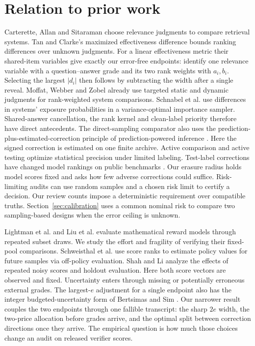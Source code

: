 \documentclass[11pt]{article}
\begin{document}
\section{Relation to prior work}
Carterette, Allan and Sitaraman \cite{carterette} choose relevance judgments to compare retrieval systems. Tan and Clarke's maximized effectiveness difference \cite{tan} bounds ranking differences over unknown judgments. For a linear effectiveness metric their shared-item variables give exactly our error-free endpoints: identify one relevance variable with a question--answer grade and its two rank weights with $a_i,b_i$. Selecting the largest $|d_i|$ then follows by subtracting the width after a single reveal. Moffat, Webber and Zobel \cite{moffat} already use targeted static and dynamic judgments for rank-weighted system comparisons. Schnabel et al. \cite{schnabel} use differences in systems' exposure probabilities in a variance-optimal importance sampler. Shared-answer cancellation, the rank kernel and clean-label priority therefore have direct antecedents. The direct-sampling comparator also uses the prediction-plus-estimated-correction principle of prediction-powered inference \cite{ppi}. Here the signed correction is estimated on one finite archive. Active comparison \cite{sawade} and active testing \cite{kossen} optimize statistical precision under limited labeling. Test-label corrections have changed model rankings on public benchmarks \cite{northcutt}. Our erasure radius holds model scores fixed and asks how few adverse corrections could suffice. Risk-limiting audits \cite{stark} can use random samples and a chosen risk limit to certify a decision. Our review counts impose a deterministic requirement over compatible truths. Section~\ref{sec:calibration} uses a common nominal risk to compare two sampling-based designs when the error ceiling is unknown.

Lightman et al. \cite{lightman} and Liu et al. \cite{ace} evaluate mathematical reward models through repeated subset draws. We study the effort and fragility of verifying their fixed-pool comparisons. Schweisthal et al. \cite{bon} use score ranks to estimate policy values for future samples via off-policy evaluation. Shah and Li \cite{hold} analyze the effects of repeated noisy scores and holdout evaluation. Here both score vectors are observed and fixed. Uncertainty enters through missing or potentially erroneous external grades. The largest-$e$ adjustment for a single endpoint also has the integer budgeted-uncertainty form of Bertsimas and Sim \cite{bertsimas}. Our narrower result couples the two endpoints through one fallible transcript: the sharp $2e$ width, the two-price allocation before grades arrive, and the optimal split between correction directions once they arrive. The empirical question is how much those choices change an audit on released verifier scores.
\end{document}
